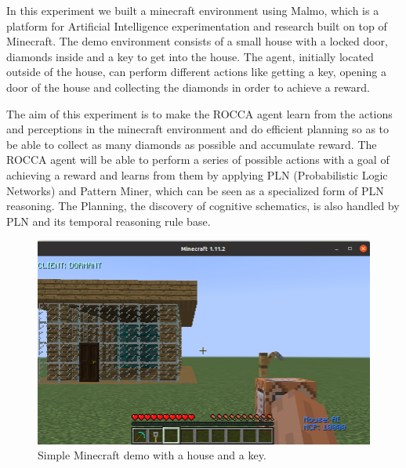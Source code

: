 \documentclass[runningheads]{llncs}
\begin{document}
In this experiment we built a minecraft environment using Malmo, which is a platform for Artificial Intelligence experimentation and research built on top of Minecraft. The demo environment consists of a small house with a locked door, diamonds inside and a key to get into the house. The agent, initially located outside of the house, can perform different actions like getting a key, opening a door of the house and collecting the diamonds in order to achieve a reward. \par
The aim of this experiment is to make the ROCCA agent learn from the actions and perceptions in the minecraft environment and do efficient planning so as to be able to collect as many diamonds as possible and accumulate reward. The ROCCA agent will be able to perform a series of possible actions with a goal of achieving a reward and learns from them by applying PLN (Probabilistic Logic Networks) and Pattern Miner, which can be seen as a specialized form of PLN reasoning. The Planning, the discovery of cognitive schematics, is also handled by PLN and its temporal reasoning rule base.

\begin{figure}[htbp]
\centerline{\includegraphics[scale=.2]{pictures/simple_demo.png}}
\caption{Simple Minecraft demo with a house and a key.}
\label{fig}
\end{figure}
\end{document}
